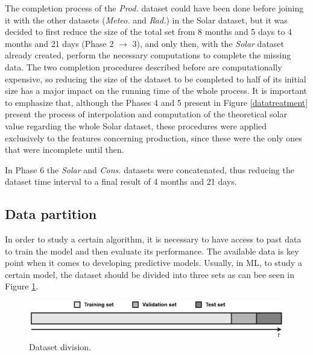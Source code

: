 The completion process of the \textit{Prod.} dataset could have been done before joining it with the other datasets (\textit{Meteo.} and \textit{Rad.}) in the Solar dataset, but it was decided to first reduce the size of the total set from 8 months and 5 days to 4 months and 21 days (Phase 2 $\to$ 3), and only then, with the \textit{Solar} dataset already created, perform the necessary computations to complete the missing data. The two completion procedures described before are computationally expensive, so reducing the size of the dataset to be completed to half of its initial size has a major impact on the running time of the whole process. It is important to emphasize that, although the Phases 4 and 5 present in Figure \ref{datatreatment} present the process of interpolation and computation of the theoretical solar value regarding the whole Solar dataset, these procedures were applied exclusively to the features concerning production, since these were the only ones that were incomplete until then.



In Phase 6 the \textit{Solar} and \textit{Cons.} datasets were concatenated, thus reducing the dataset time interval to a final result of 4 months and 21 days.

\subsection{Data partition}\label{chap3:subsec:data_partition}

In order to study a certain algorithm, it is necessary to have access to past data to train the model and then evaluate its performance. The available data is key point when it comes to developing predictive models. Usually, in \ac{ML}, to study a certain model, the dataset should be divided into three sets as can bee seen in Figure \ref{division}. 

\begin{figure}[h!]
    \centering
    \begin{center}
    \includegraphics[width=1\textwidth]{Images/division.png}
    \caption{Dataset division.}
    \label{division}
    \end{center}
\end{figure}

